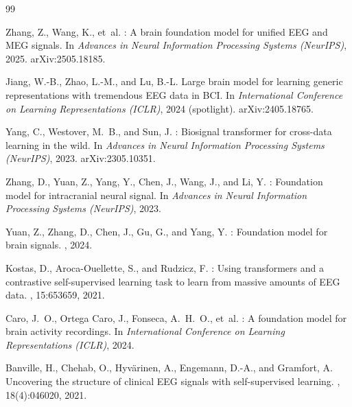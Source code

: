 \documentclass[11pt]{article}
\begin{document}
\begin{thebibliography}{99}\label{sec:refs}


Zhang, Z., Wang, K., et~al.
: A brain foundation model for unified {EEG} and
{MEG} signals.
\newblock In {\em Advances in Neural Information Processing Systems
(NeurIPS)}, 2025. arXiv:2505.18185.

Jiang, W.-B., Zhao, L.-M., and Lu, B.-L.
\newblock Large brain model for learning generic representations with
tremendous {EEG} data in {BCI}.
\newblock In {\em International Conference on Learning Representations
(ICLR)}, 2024 (spotlight). arXiv:2405.18765.

Yang, C., Westover, M.~B., and Sun, J.
: Biosignal transformer for cross-data learning in the wild.
\newblock In {\em Advances in Neural Information Processing Systems
(NeurIPS)}, 2023. arXiv:2305.10351.

Zhang, D., Yuan, Z., Yang, Y., Chen, J., Wang, J., and Li, Y.
: Foundation model for intracranial neural signal.
\newblock In {\em Advances in Neural Information Processing Systems
(NeurIPS)}, 2023.

Yuan, Z., Zhang, D., Chen, J., Gu, G., and Yang, Y.
: Foundation model for brain signals.
, 2024.

Kostas, D., Aroca-Ouellette, S., and Rudzicz, F.
: Using transformers and a contrastive self-supervised
learning task to learn from massive amounts of {EEG} data.
, 15:653659, 2021.

Caro, J.~O., Ortega Caro, J., Fonseca, A.~H.~O., et~al.
: A foundation model for brain activity recordings.
\newblock In {\em International Conference on Learning Representations
(ICLR)}, 2024.

Banville, H., Chehab, O., Hyv\"arinen, A., Engemann, D.-A., and Gramfort, A.
\newblock Uncovering the structure of clinical {EEG} signals with
self-supervised learning.
, 18(4):046020, 2021.


\end{thebibliography}
\end{document}
